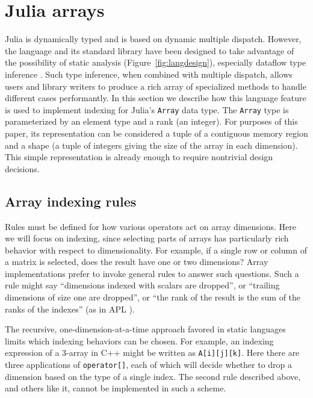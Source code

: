 \documentclass[preprint]{sigplanconf}
\newcommand{\code}[1]{\texttt{#1}}
\begin{document}
\section{Julia arrays}

Julia\cite{Bezanson:2012jf} is dynamically typed and is based on dynamic
multiple dispatch. However, the language and its standard library have been
designed to take advantage of the possibility of static analysis
(Figure~\ref{fig:langdesign}), especially dataflow type inference \cite{Cousot:1977, kaplanullman}. Such type
inference, when combined with multiple dispatch, allows users and library
writers to produce a rich array of specialized methods to handle different
cases performantly. In this section we describe how this language feature
is used to implement indexing for Julia's \code{Array} data type.
The \code{Array} type is parameterized by an element type and a rank (an
integer). For purposes of this paper, its representation can be considered a
tuple of a contiguous memory region and a shape (a tuple of integers giving
the size of the array in each dimension). This simple representation is
already enough to require nontrivial design decisions.





\subsection{Array indexing rules}

Rules must be defined for how various operators act
on array dimensions. Here we will focus on indexing, since selecting parts of
arrays has particularly rich behavior with respect to dimensionality. For
example, if a single row or column of a matrix is selected, does the result
have one or two dimensions? Array implementations prefer to invoke general
rules to answer such questions. Such a rule might say ``dimensions indexed
with scalars are dropped'', or ``trailing dimensions of size one are
dropped'', or ``the rank of the result is the sum of the ranks of the
indexes'' (as in APL \cite{APL}).

The recursive, one-dimension-at-a-time approach favored in static languages limits
which indexing behaviors can be chosen. For example, an indexing expression
of a 3-array in C++ might be written as \code{A[i][j][k]}. Here there are 
three applications of \code{operator[]}, each of which will decide whether to
drop a dimension based on the type of a single index. The second rule
described above, and others like it, cannot be implemented in such a
scheme.
\end{document}
